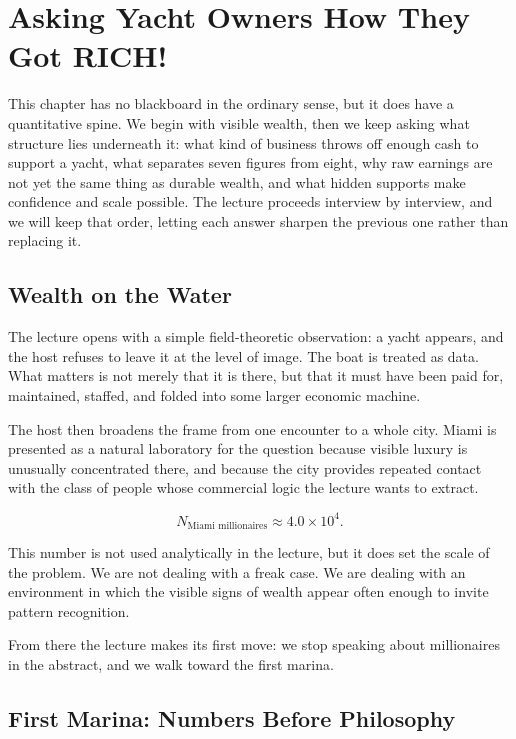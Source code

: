 \chapter{Asking Yacht Owners How They Got RICH!}

This chapter has no blackboard in the ordinary sense, but it does have a quantitative spine. We begin with visible wealth, then we keep asking what structure lies underneath it: what kind of business throws off enough cash to support a yacht, what separates seven figures from eight, why raw earnings are not yet the same thing as durable wealth, and what hidden supports make confidence and scale possible. The lecture proceeds interview by interview, and we will keep that order, letting each answer sharpen the previous one rather than replacing it.

\section{Wealth on the Water}

The lecture opens with a simple field-theoretic observation: a yacht appears, and the host refuses to leave it at the level of image. The boat is treated as data. What matters is not merely that it is there, but that it must have been paid for, maintained, staffed, and folded into some larger economic machine.

The host then broadens the frame from one encounter to a whole city. Miami is presented as a natural laboratory for the question because visible luxury is unusually concentrated there, and because the city provides repeated contact with the class of people whose commercial logic the lecture wants to extract.

\begin{equation}
N_{\text{Miami millionaires}} \approx 4.0\times 10^{4}.
\end{equation}

This number is not used analytically in the lecture, but it does set the scale of the problem. We are not dealing with a freak case. We are dealing with an environment in which the visible signs of wealth appear often enough to invite pattern recognition.

From there the lecture makes its first move: we stop speaking about millionaires in the abstract, and we walk toward the first marina.

\section{First Marina: Numbers Before Philosophy}


